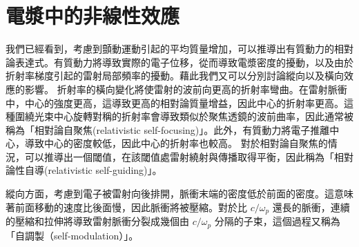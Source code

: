 \section{電漿中的非線性效應}
我們已經看到，考慮到顫動運動引起的平均質量增加，可以推導出有質動力的相對論表達式。有質動力將導致實際的電子位移，從而導致電漿密度的擾動，以及由於折射率梯度引起的雷射局部頻率的擾動。藉此我們又可以分別討論縱向以及橫向效應的影響。\cite{doi:10.1063/1.1692942}
折射率的橫向變化將使雷射的波前向更高的折射率彎曲。在雷射脈衝中，中心的強度更高，這導致更高的相對論質量增益，因此中心的折射率更高。這種圍繞光束中心旋轉對稱的折射率會導致類似於聚焦透鏡的波前曲率，因此通常被稱為「相對論自聚焦(relativistic self-focusing)」。此外，有質動力將電子推離中心，導致中心的密度較低，因此中心的折射率也較高。 對於相對論自聚焦的情況，可以推導出一個閾值，在該閾值處雷射繞射與傳播取得平衡，因此稱為「相對論性自導(relativistic self-guiding)」。

縱向方面，考慮到電子被雷射向後排開，脈衝末端的密度低於前面的密度。這意味著前面移動的速度比後面慢，因此脈衝將被壓縮。對於比 \(c/\omega_p\) 還長的脈衝，連續的壓縮和拉伸將導致雷射脈衝分裂成幾個由 \(c/\omega_p\) 分隔的子束\cite{doi:10.1063/1.1692942}，這個過程又稱為「自調製（self-modulation）」。
